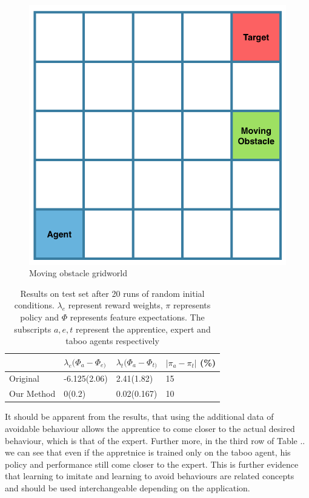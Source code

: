 \documentclass[letterpaper]{article}
\begin{document}
\begin{figure}[t]
  \centering
  \includegraphics[width=0.5\columnwidth]{images/gridworld.png}
  \caption{Moving obstacle gridworld 	\label{fig:gridworld}}
\end{figure}
\begin{table}[]
\centering

\label{tab:results}
\begin{tabular}{|l|l|l|l|}
\hline
           & $\lambda_e(\Phi_{a}-\Phi_{e)}$& $\lambda_t(\Phi_{a}-\Phi_{t)}$ & $|\pi_a - \pi_t|$ (\%) \\ \hline
Original   & -6.125(2.06)        & 2.41(1.82)         & 15                    \\ \hline
Our Method & 0(0.2)              & 0.02(0.167)        & 10                    \\ \hline
\end{tabular}
\caption{Results on test set after 20 runs of random initial conditions. $\lambda_e$ represent reward weights, $\pi$ represents policy and $\Phi$ represents feature expectations. The subscripts $a,e,t$ represent the apprentice, expert and taboo agents respectively}
\end{table}
It should be apparent from the results, that using the additional data of avoidable behaviour allows the apprentice to 
come closer to the actual desired behaviour, which is that of the expert. Further more, in the third row of Table .. we can see that
even if the appretnice is trained only on the taboo agent, his policy and performance still come closer to the expert. This is further
evidence that learning to imitate and learning to avoid behaviours are related concepts and should be used interchangeable depending on the application.
\end{document}

